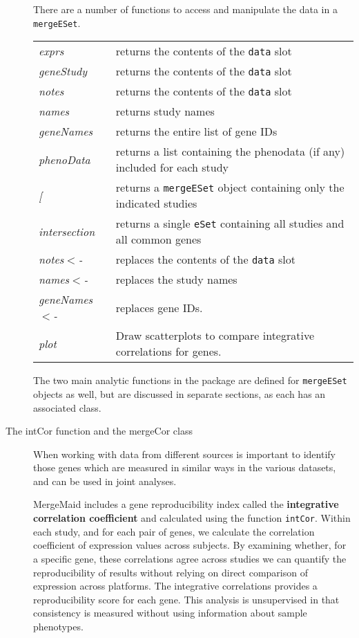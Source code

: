 \documentclass[12pt]{article}
\begin{document}
\begin{description}
There are a number of functions to access and manipulate the data in
a \verb+mergeESet+.
\begin{center}
  \begin{tabular}{|lp{5in}|}
    \hline
    {\it exprs} & returns the contents of the \verb+data+ slot\\
{\it geneStudy } & returns the contents of the \verb+data+ slot\\
{\it notes} & returns the contents of the \verb+data+ slot\\
{\it names} & returns study names\\
{\it geneNames} & returns the entire list of gene IDs\\
{\it phenoData } & returns a list containing the phenodata (if any) included for each study\\
{\it [} & returns a \verb+mergeESet+ object containing only the indicated studies\\
{\it intersection} & returns a single \verb+eSet+ containing all studies and all common genes\\
{\it notes$<$-} & replaces the contents of the \verb+data+ slot\\
{\it names$<$-} & replaces the study names\\
{\it geneNames$<$-} & replaces gene IDs.  \\
{\it plot} &Draw scatterplots to compare integrative correlations
for genes. \\ \hline
  \end{tabular}
\end{center}
 The two main analytic functions in the package are defined for \verb+mergeESet+ objects as well, but are discussed in separate sections, as each has an associated class.
\item[The intCor function and the mergeCor class]  When working with data from different sources is important to identify those genes which are measured in similar ways in the various datasets, and can be used in joint analyses.

MergeMaid includes a gene reproducibility index called the {\bf
integrative correlation coefficient} and calculated using the
function \verb+intCor+. Within each study, and for each pair of
genes, we calculate the correlation coefficient of expression values
across subjects. By examining whether, for a specific gene, these
correlations agree across studies we can quantify the
reproducibility of results without relying on direct comparison of
expression across platforms. The integrative correlations provides a
reproducibility score for each gene.
  This analysis is unsupervised in that consistency is
measured without using information about sample phenotypes.


\end{description}
\end{document}
